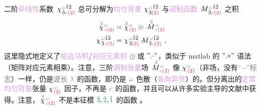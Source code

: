 二阶\textcolor{Plum}{非线性}系数 $\Xint{{}^{}_{\mathcolor{gray}{-}}}{23}{\chi}^{\;\! \mathcolor{gray}{\omega} \hat{1} \hat{2} }_{\;\! \hat{3} \mathcolor{gray}{z} \textcolor{Maroon}{(2)} }$ 总可分解为\textcolor{Plum}{均匀背景} ${\chi}^{\;\! \mathcolor{gray}{\omega} \hat{1} \hat{2} }_{\;\! \hat{3} \textcolor{Maroon}{(2)} }$ 与\textcolor{Plum}{调制函数} $\Xint{\mathcolor{gray}{-}}{18}{M}^{\;\! \mathcolor{gray}{\omega} \hat{1} \hat{2} }_{\;\! \hat{3} \mathcolor{gray}{z} \textcolor{Maroon}{(2)} }$ 之积
\begin{subequations} \label{eq:chi2-modulate}
\begin{align}
	\Xint{{}^{}_{\mathcolor{gray}{-}}}{23}{\bar{\bar{\bar{\chi}}}}^{\;\! \mathcolor{gray}{\omega} }_{\;\! \mathcolor{gray}{z} \textcolor{Maroon}{(2)} } &= \bar{\bar{\bar{\chi}}}^{\;\! \mathcolor{gray}{\omega} }_{\;\! \textcolor{Maroon}{(2)} } \odot \Xint{\mathcolor{gray}{-}}{18}{\bar{\bar{\bar{M}}}}^{\;\! \mathcolor{gray}{\omega} }_{\;\! \mathcolor{gray}{z} \textcolor{Maroon}{(2)} } \label{eq:vec-chi2-modulate} \\
	\Xint{{}^{}_{\mathcolor{gray}{-}}}{23}{\chi}^{\;\! \mathcolor{gray}{\omega} \hat{1} \hat{2} }_{\;\! \hat{3} \mathcolor{gray}{z} \textcolor{Maroon}{(2)} } &= {\chi}^{\;\! \mathcolor{gray}{\omega} \hat{1} \hat{2} }_{\;\! \hat{3} \textcolor{Maroon}{(2)} } \Xint{\mathcolor{gray}{-}}{18}{M}^{\;\! \mathcolor{gray}{\omega} \hat{1} \hat{2} }_{\;\! \hat{3} \mathcolor{gray}{z} \textcolor{Maroon}{(2)} } ~, \label{eq:components-chi2-modulate}
\end{align}
\end{subequations}
这里隐式地定义了\textcolor{Plum}{哈达马积}/\textcolor{Plum}{对应元素积} $\odot$ 或 $"{.\cdot}"$，类似于 matlab 的 $"{.*}"$ 语法（矩阵对应元素相乘）。注意，三阶\textcolor{Plum}{调制张量}\textcolor{NavyBlue}{场} $\Xint{\mathcolor{gray}{-}}{18}{\bar{\bar{\bar{M}}}}^{\;\! \mathcolor{gray}{\omega} }_{\;\! \mathcolor{gray}{z} \textcolor{Maroon}{(2)} }$ 像 ${\chi}^{\;\! \mathcolor{gray}{\omega} }_{\;\! \textcolor{Maroon}{(2)} }$（\textcolor{NavyBlue}{非场}，没有\textcolor{gray}{“$-$”标志}）一样，仍是\textcolor{gray}{波长} $\mathcolor{gray}{\lambda}$ 的函数，即仍是 $\mathcolor{gray}{\omega}$ \textcolor{NavyBlue}{色散}（\textcolor{Plum}{各向异性}）的。但分离出的\textcolor{Plum}{定常}\textcolor{Plum}{均匀背景}张量 ${\chi}^{\;\! \mathcolor{gray}{\omega} }_{\;\! \textcolor{Maroon}{(2)} }$ 因子，不再是 $\mathcolor{gray}{\bar{r}}$ 的函数，并且可以从许多\textcolor{NavyBlue}{实验主导}的文献中获得\cite{nyePhysicalPropertiesCrystals2012,zuOpticalSecondHarmonic2024,zuAnalyticalNumericalModeling2022,gananyQuasiphaseMatchingLiNbO32006,segondsLinearNonlinearOptical2004,dolevLinearNonlinearOptical2009,kaschkeCalculationNonlinearOptical1989,itoGeneralizedStudyAngular1975}。注意，$\Xint{{}^{}_{\mathcolor{gray}{-}}}{23}{\bar{\bar{\bar{\chi}}}}^{\;\! \mathcolor{gray}{\omega} }_{\;\! \mathcolor{gray}{z} \textcolor{Maroon}{(2)} }$ 不是\textcolor{PineGreen}{本征模} $\textcolor{PineGreen}{\hat{3}},\textcolor{PineGreen}{\hat{2}},\textcolor{PineGreen}{\hat{1}}$ 的函数 。

